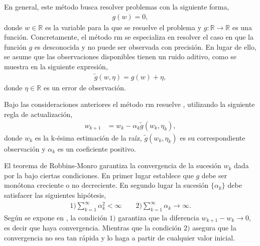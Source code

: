 En general, este método busca resolver problemas con la siguiente forma, 
\begin{align}
    g(w) =0,
    \label{eq:RM_problem}
\end{align}
donde $w\in \mathbb{R}$ es la variable para la que se resuelve el problema y $g:\mathbb{R}\rightarrow{\mathbb{R}}$ es una función. Concretamente, el método \acrshort{rm} se especializa en resolver el caso en que la función $g$ es desconocida y no puede ser observada con precisión. En lugar de ello, se asume que las observaciones disponibles tienen un ruido aditivo, como se muestra en la siguiente expresión,
\begin{align}
    \tilde{g}(w, \eta) = g(w) + \eta,
\end{align}
donde $\eta \in \mathbb{R}$ es un error de observación.

Bajo las consideraciones anteriores el método \acrshort{rm} resuelve , utilizando la siguiente regla de actualización,
\begin{align}
    w_{k+1} &= w_{k} -\alpha_k\tilde{g}(w_k, \eta_k),
    \label{eq:RM_rule}
\end{align}
donde $w_k$ es la k-ésima estimación de la raíz, $\tilde{g}(w_k, \eta_k)$ es su correspondiente observación y $\alpha_k$ es un coeficiente positivo.

El teorema de Robbins-Monro garantiza la convergencia de la sucesión $w_k$ dada por la  bajo ciertas condiciones. En primer lugar establece que $g$ debe ser monótona creciente o no decreciente. En segundo lugar la sucesión $\{\alpha_k\}$ debe satisfacer las siguientes hipótesis,
\begin{align}
    1) \sum_{k=1}^{\infty}\alpha_{k}^2 < \infty \qquad 2)\sum_{k=1}^{\infty} \alpha_{k} \rightarrow \infty.
\end{align}
Según se expone en \cite{Shiyu2022}, la condición $1)$ garantiza que la diferencia $w_{k+1}-w_{k} \rightarrow 0$, es decir que haya convergencia. Mientras que la condición $2)$ asegura que la convergencia no sea tan rápida y lo haga a partir de cualquier valor inicial.

